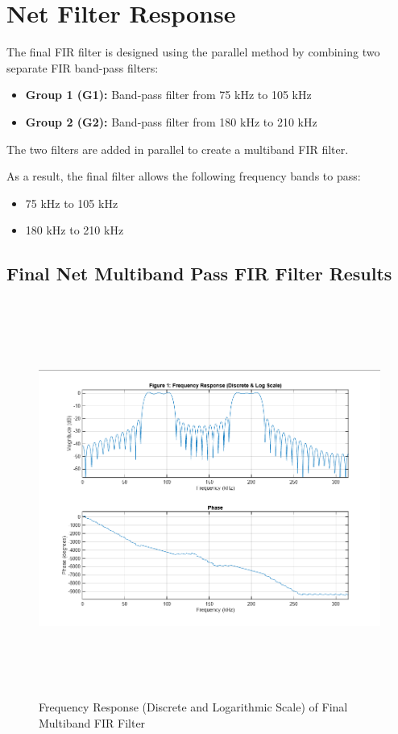 \documentclass[12pt]{article}
\begin{document}
\section{Net Filter Response}
The final FIR filter is designed using the parallel method by combining two separate FIR band-pass filters:

\begin{itemize}
    \item \textbf{Group 1 (G1):} Band-pass filter from 75 kHz to 105 kHz
    \item \textbf{Group 2 (G2):} Band-pass filter from 180 kHz to 210 kHz
\end{itemize}

The two filters are added in parallel to create a multiband FIR filter. 

As a result, the final filter allows the following frequency bands to pass:
\begin{itemize}
    \item 75 kHz to 105 kHz
    \item 180 kHz to 210 kHz
\end{itemize}
\subsection{Final Net Multiband Pass FIR Filter Results}

\begin{figure}[H]
    \centering
    \includegraphics[height=13cm]{1.png}
    \caption{Frequency Response (Discrete and Logarithmic Scale) of Final Multiband FIR Filter}
    \label{fig:final_freq_response}
\end{figure}
\end{document}
